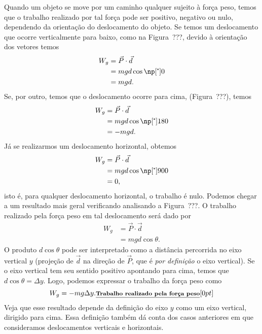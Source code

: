 Quando um objeto se move por um caminho qualquer sujeito à força peso, temos que o trabalho realizado por tal força pode ser positivo, negativo ou nulo, dependendo da orientação do deslocamento do objeto. Se temos um deslocamento que ocorre verticalmente para baixo, como na Figura~???, devido à orientação dos vetores temos
\begin{align}
  W_g &= \vec{P}\cdot\vec{d} \\
  &= mgd\cos\degree{0} \\
  &= mgd.
\end{align}
%
Se, por outro, temos que o deslocamento ocorre para cima, (Figura~???), temos
\begin{align}
  W_g &= \vec{P}\cdot\vec{d} \\
  &= mgd\cos\degree{180} \\
  &= -mgd.
\end{align}
%
Já se realizarmos um deslocamento horizontal, obtemos
\begin{align}
  W_g &= \vec{P}\cdot\vec{d} \\
  &= mgd\cos\degree{900} \\
  &= 0,
\end{align}
%
isto é, para qualquer deslocamento horizontal, o trabalho é nulo. Podemos chegar a um resultado mais geral verificando analisando a Figura~???. 
O trabalho realizado pela força peso em tal deslocamento será dado por
\begin{align}
  W_g &= \vec{P}\cdot\vec{d} \\
  &= mgd\cos\theta.
\end{align}
%
O produto $d\cos\theta$ pode ser interpretado como a distância percorrida no eixo vertical $y$ (projeção de $\vec{d}$ na direção de $\vec{P}$, que é \emph{por definição} o eixo vertical). Se o eixo vertical tem seu sentido positivo apontando para cima, temos que $d\cos\theta = \Delta y$. Logo, podemos expressar o trabalho da força peso como
\begin{equation}\label{Eq:TrabalhoPeso}
  W_g = - mg\Delta y. \relax{\footnotesize\emph{\textbf{Trabalho realizado pela força peso}}}[0pt]
\end{equation}
%
Veja que esse resultado depende da definição do eixo $y$ como um eixo vertical, dirigido para cima. Essa definição também dá conta dos casos anteriores em que consideramos deslocamentos verticais e horizontais.
  
